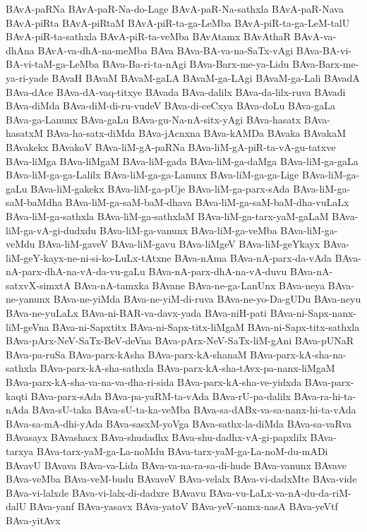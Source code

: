 {BAvA-paRNa
BAvA-paR-Na-do-Lage
BAvA-paR-Na-sathxla
BAvA-paR-Nava
BAvA-piRta
BAvA-piRtaM
BAvA-piR-ta-ga-LeMba
BAvA-piR-ta-ga-LeM-talU
BAvA-piR-ta-sathxla
BAvA-piR-ta-veMba
BAvAtamx
BAvAthaR
BAvA-va-dhAna
BAvA-va-dhA-na-meMba
BAva
BAva-BA-va-na-SaTx-vAgi
BAva-BA-vi-BA-vi-taM-ga-LeMba
BAva-Ba-ri-ta-nAgi
BAva-Barx-me-ya-Lidu
BAva-Barx-me-ya-ri-yade
BAvaH
BAvaM
BAvaM-gaLA
BAvaM-ga-LAgi
BAvaM-ga-Lali
BAvadA
BAva-dAce
BAva-dA-vaq-titxye
BAvada
BAva-dalilx
BAva-da-lilx-ruva
BAvadi
BAva-diMda
BAva-diM-di-ru-vudeV
BAva-di-ceCxya
BAva-doLu
BAva-gaLa
BAva-ga-Lanunx
BAva-gaLu
BAva-gu-Na-nA-sitx-yAgi
BAva-hasatx
BAva-hasatxM
BAva-ha-satx-diMda
BAva-jAcnxna
BAva-kAMDa
BAvaka
BAvakaM
BAvakekx
BAvakoV
BAva-liM-gA-paRNa
BAva-liM-gA-piR-ta-vA-gu-tatxve
BAva-liMga
BAva-liMgaM
BAva-liM-gada
BAva-liM-ga-daMga
BAva-liM-ga-gaLa
BAva-liM-ga-ga-Lalilx
BAva-liM-ga-ga-Lanunx
BAva-liM-ga-ga-Lige
BAva-liM-ga-gaLu
BAva-liM-gakekx
BAva-liM-ga-pUje
BAva-liM-ga-parx-sAda
BAva-liM-ga-saM-baMdha
BAva-liM-ga-saM-baM-dhava
BAva-liM-ga-saM-baM-dha-vuLaLx
BAva-liM-ga-sathxla
BAva-liM-ga-sathxlaM
BAva-liM-ga-tarx-yaM-gaLaM
BAva-liM-ga-vA-gi-dudxdu
BAva-liM-ga-vanunx
BAva-liM-ga-veMba
BAva-liM-ga-veMdu
BAva-liM-gaveV
BAva-liM-gavu
BAva-liMgeV
BAva-liM-geYkayx
BAva-liM-geY-kayx-ne-ni-si-ko-LuLx-tAtxne
BAva-nAma
BAva-nA-parx-da-vAda
BAva-nA-parx-dhA-na-vA-da-vu-gaLu
BAva-nA-parx-dhA-na-vA-duvu
BAva-nA-satxvX-simxtA
BAva-nA-tamxka
BAvane
BAva-ne-ga-LanUnx
BAva-neya
BAva-ne-yanunx
BAva-ne-yiMda
BAva-ne-yiM-di-ruva
BAva-ne-yo-Da-gUDu
BAva-neyu
BAva-ne-yuLaLx
BAva-ni-BAR-va-davx-yada
BAva-niH-pati
BAva-ni-Sapx-nanx-liM-geVna
BAva-ni-Sapxtitx
BAva-ni-Sapx-titx-liMgaM
BAva-ni-Sapx-titx-sathxla
BAva-pArx-NeV-SaTx-BeV-deVna
BAva-pArx-NeV-SaTx-liM-gAni
BAva-pUNaR
BAva-pa-ruSa
BAva-parx-kAsha
BAva-parx-kA-shanaM
BAva-parx-kA-sha-na-sathxla
BAva-parx-kA-sha-sathxla
BAva-parx-kA-sha-tAvx-pa-nanx-liMgaM
BAva-parx-kA-sha-va-na-va-dha-ri-sida
BAva-parx-kA-sha-ve-yidxda
BAva-parx-kaqti
BAva-parx-sAda
BAva-pa-yaRM-ta-vAda
BAva-rU-pa-dalilx
BAva-ra-hi-ta-nAda
BAva-sU-taka
BAva-sU-ta-ka-veMba
BAva-sa-dABx-va-sa-nanx-hi-ta-vAda
BAva-sa-mA-dhi-yAda
BAva-sasxM-yoVga
BAva-sathx-la-diMda
BAva-sa-vaRva
BAvasayx
BAvashacx
BAva-shudadhx
BAva-shu-dadhx-vA-gi-papxlilx
BAva-tarxya
BAva-tarx-yaM-ga-La-noMdu
BAva-tarx-yaM-ga-La-noM-du-mADi
BAvavU
BAvava
BAva-va-Lida
BAva-va-na-ra-sa-di-hude
BAva-vanunx
BAvave
BAva-veMba
BAva-veM-budu
BAvaveV
BAva-velalx
BAva-vi-dadxMte
BAva-vide
BAva-vi-lalxde
BAva-vi-lalx-di-dadxre
BAvavu
BAva-vu-LaLx-va-nA-du-da-riM-dalU
BAva-yanf
BAva-yasavx
BAva-yatoV
BAva-yeV-namx-nasA
BAva-yeVtf
BAva-yitAvx
}
